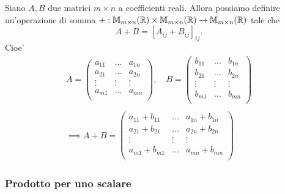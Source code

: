 Siano $A, B$ due matrici $m \times n$ a coefficienti reali. Allora possiamo definire un'operazione di somma $+ : \mathbb{M}_{m \times n}(\mathbb{R}) \times \mathbb{M}_{m \times n}(\mathbb{R}) \to \mathbb{M}_{m \times n}(\mathbb{R})$ tale che \begin{equation}
    A + B = [A_{ij} + B_{ij}]_{ij}.
\end{equation}
Cioe' \begin{gather*}
    A = \begin{pmatrix}
        a_{11}  & \dots     & a_{1n} \\
        a_{21}  & \dots     & a_{2n} \\
        \vdots  & \vdots    & \vdots \\
        a_{m1}  & \dots     & a_{mn} \\
    \end{pmatrix},\quad
    B = \begin{pmatrix}
        b_{11}  & \dots     & b_{1n} \\
        b_{21}  & \dots     & b_{2n} \\
        \vdots  & \vdots    & \vdots \\
        b_{m1}  & \dots     & b_{mn} \\
    \end{pmatrix} \\
    \\
    \implies
    A + B = \begin{pmatrix}
        a_{11} + b_{11}  & \dots     & a_{1n} + b_{1n} \\
        a_{21} + b_{21}  & \dots     & a_{2n} + b_{2n} \\
        \vdots           & \vdots    & \vdots          \\
        a_{m1} + b_{m1}  & \dots     & a_{mn} + b_{mn} \\
    \end{pmatrix}   
\end{gather*}

\subsubsection{Prodotto per uno scalare}

